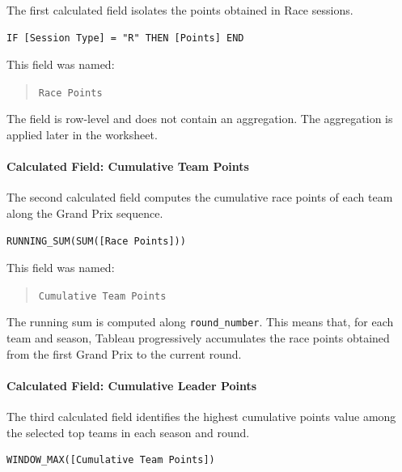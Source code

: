\documentclass[12pt,a4paper]{article}
\begin{document}
	The first calculated field isolates the points obtained in Race sessions.
	
	\begin{lstlisting}[basicstyle=\ttfamily\footnotesize]
		IF [Session Type] = "R" THEN [Points] END
	\end{lstlisting}
	
	This field was named:
	
	\begin{quote}
		\texttt{Race Points}
	\end{quote}
	
	The field is row-level and does not contain an aggregation.
	The aggregation is applied later in the worksheet.
	
	\paragraph{Calculated Field: Cumulative Team Points}
	
	The second calculated field computes the cumulative race points of each team along the Grand Prix sequence.
	
	\begin{lstlisting}[basicstyle=\ttfamily\footnotesize]
		RUNNING_SUM(SUM([Race Points]))
	\end{lstlisting}
	
	This field was named:
	
	\begin{quote}
		\texttt{Cumulative Team Points}
	\end{quote}
	
	The running sum is computed along \texttt{round\_number}.
	This means that, for each team and season, Tableau progressively accumulates the race points obtained from the first Grand Prix to the current round.
	
	\paragraph{Calculated Field: Cumulative Leader Points}
	
	The third calculated field identifies the highest cumulative points value among the selected top teams in each season and round.
	
	\begin{lstlisting}[basicstyle=\ttfamily\footnotesize]
		WINDOW_MAX([Cumulative Team Points])
	\end{lstlisting}
	
\end{document}
